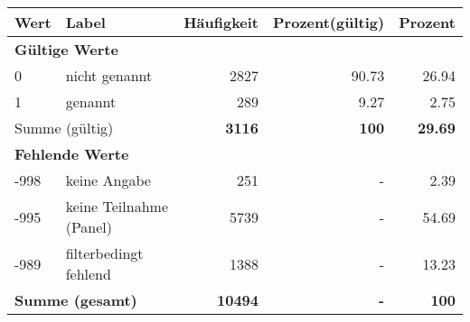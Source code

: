      \begin{longtable}{lXrrr}
     \toprule
     \textbf{Wert} & \textbf{Label} & \textbf{Häufigkeit} & \textbf{Prozent(gültig)} & \textbf{Prozent} \\
     \endhead
     \midrule
     \multicolumn{5}{l}{\textbf{Gültige Werte}}\\

     0 &
     \multicolumn{1}{X}{ nicht genannt   } &


       \num{2827} &
       \num[round-mode=places,round-precision=2]{90.73} &
         \num[round-mode=places,round-precision=2]{26.94} \\

     1 &
     \multicolumn{1}{X}{ genannt   } &


       \num{289} &
       \num[round-mode=places,round-precision=2]{9.27} &
         \num[round-mode=places,round-precision=2]{2.75} \\
     \midrule
     \multicolumn{2}{l}{Summe (gültig)} &
       \textbf{\num{3116}} &
     \textbf{\num{100}} &
       \textbf{\num[round-mode=places,round-precision=2]{29.69}} \\
     \multicolumn{5}{l}{\textbf{Fehlende Werte}}\\
       -998 &
       keine Angabe &
         \num{251} &
        - &
         \num[round-mode=places,round-precision=2]{2.39} \\
       -995 &
       keine Teilnahme (Panel) &
         \num{5739} &
        - &
         \num[round-mode=places,round-precision=2]{54.69} \\
       -989 &
       filterbedingt fehlend &
         \num{1388} &
        - &
         \num[round-mode=places,round-precision=2]{13.23} \\
     \midrule
     \multicolumn{2}{l}{\textbf{Summe (gesamt)}} &
          \textbf{\num{10494}} &
        \textbf{-} &
        \textbf{\num{100}} \\
     \bottomrule
     \end{longtable}
     
